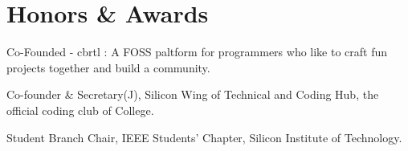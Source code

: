 \documentclass[]{deedy-resume-openfont}
\begin{document}
\section{Honors \& Awards}
\begin{tightemize}
\item Co-Founded - cbrtl : A FOSS paltform for programmers who like to craft fun projects together and build a community.\\
\item Co-founder \& Secretary(J), Silicon Wing of Technical and Coding Hub, the official coding club of College.\\
\item Student Branch Chair, IEEE Students’ Chapter, Silicon Institute of Technology.\\
\end{tightemize}
     \ 
     
\end{document}
